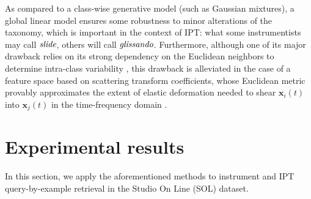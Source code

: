As compared to a class-wise generative model (such as Gaussian mixtures), a global linear model ensures some robustness to minor alterations of the taxonomy, which is important in the context of IPT: \eg{} what some instrumentists may call $\emph{slide}$, others will call $\emph{glissando}$.
Furthermore, although one of its major drawback relies on its strong dependency on the Euclidean neighbors to determine intra-class variability \cite{mcfee2010icml}, this drawback is alleviated in the case of a feature space based on scattering transform coefficients, whose Euclidean metric provably approximates the extent of elastic deformation needed to shear $\boldsymbol{x}_i(t)$ into $\boldsymbol{x}_j(t)$ in the time-frequency domain \cite[Theorem 2.16]{mallat2012cpam}.



\section{Experimental results} \label{sec:exp}
In this section, we apply the aforementioned methods to instrument and IPT query-by-example retrieval in the Studio On Line (SOL) dataset.





